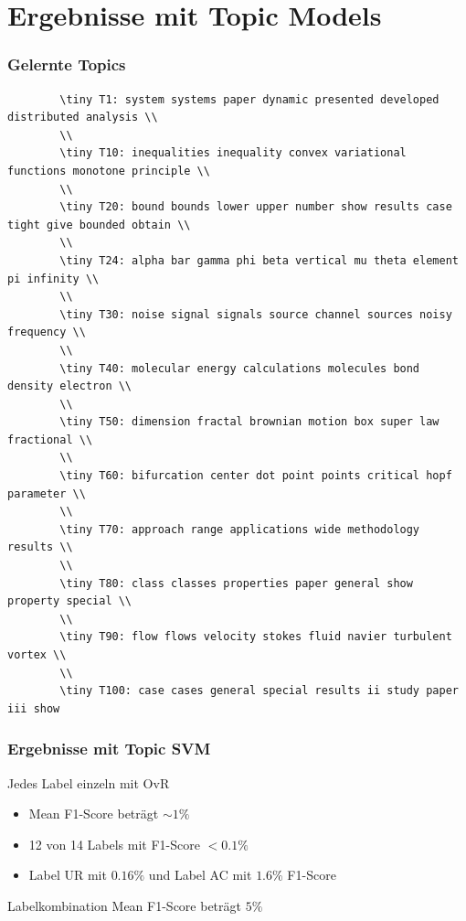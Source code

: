 \documentclass[12pt, xcolor=table]{beamer}
\begin{document}
\section{Ergebnisse mit Topic Models}
\begin{frame}
    \frametitle{Gelernte Topics}
    \begin{verbatim}
        \tiny T1: system systems paper dynamic presented developed distributed analysis \\
        \\
        \tiny T10: inequalities inequality convex variational functions monotone principle \\
        \\
        \tiny T20: bound bounds lower upper number show results case tight give bounded obtain \\
        \\
        \tiny T24: alpha bar gamma phi beta vertical mu theta element pi infinity \\
        \\
        \tiny T30: noise signal signals source channel sources noisy frequency \\
        \\
        \tiny T40: molecular energy calculations molecules bond density electron \\
        \\
        \tiny T50: dimension fractal brownian motion box super law fractional \\
        \\
        \tiny T60: bifurcation center dot point points critical hopf parameter \\
        \\
        \tiny T70: approach range applications wide methodology results \\
        \\
        \tiny T80: class classes properties paper general show property special \\
        \\
        \tiny T90: flow flows velocity stokes fluid navier turbulent vortex \\
        \\
        \tiny T100: case cases general special results ii study paper iii show
    \end{verbatim}
\end{frame}
\begin{frame}
    \frametitle{Ergebnisse mit Topic SVM}
    \begin{block}{Jedes Label einzeln mit OvR}
        \begin{itemize}
            \item Mean F1-Score beträgt $\sim 1 \%$
            \item 12 von 14 Labels mit F1-Score $< 0.1 \%$
            \item Label UR mit $0.16 \%$ und Label AC mit $1.6 \%$ F1-Score
        \end{itemize}
    \end{block}
    \begin{block}{Labelkombination}
        Mean F1-Score beträgt $5 \%$
    \end{block}
\end{frame}
\end{document}
